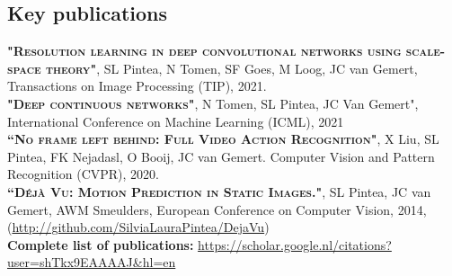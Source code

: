 \documentclass[a4paper, oneside, final]{scrartcl}
\begin{document}
\begin{center}
		\section{Key publications}
        \begin{flushleft}

            \textsc{\textbf{"Resolution learning in deep convolutional networks using scale-space theory"}}, SL Pintea, N Tomen, SF Goes, M Loog, JC van Gemert, Transactions on Image Processing (TIP), 2021.\\[3px]
            \textsc{\textbf{"Deep continuous networks"}}, N Tomen, SL Pintea, JC Van Gemert", International Conference on Machine Learning (ICML), 2021\\[3px]
			\textsc{\textbf{``No frame left behind: Full Video Action Recognition"}}, X Liu, SL Pintea, FK Nejadasl, O Booij, JC van Gemert. 
            Computer Vision and Pattern Recognition (CVPR), 2020.\\[3px]
            \textsc{\textbf{``D\'{e}j\`{a} Vu: Motion Prediction in Static Images."}}, SL Pintea, JC van Gemert, AWM Smeulders, 
            European Conference on Computer Vision, 2014, 
            (\small\href{http://github.com/SilviaLauraPintea/DejaVu}{http://github.com/SilviaLauraPintea/DejaVu})\\[10px]

            \textbf{Complete list of publications:} \href{https://scholar.google.nl/citations?user=shTkx9EAAAAJ&hl=en}{https://scholar.google.nl/citations?user=shTkx9EAAAAJ\&hl=en}\\
        \end{flushleft}

\end{center}
\end{document}
